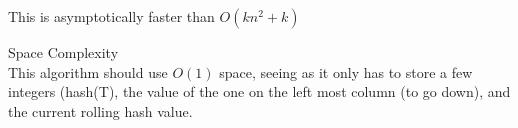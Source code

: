 \documentclass[12pt,twoside]{article}
\begin{document}
\begin{problems}
\begin{problemparts}
This is asymptotically faster than $O(kn^2 + k)$

\problempart Space Complexity \\
This algorithm should use $O(1)$ space, seeing as it only has to store a few integers (hash(T), the value of the one on the left most column (to go down), and the current rolling hash value.\\

\end{problemparts}
\end{problems}
\end{document}
